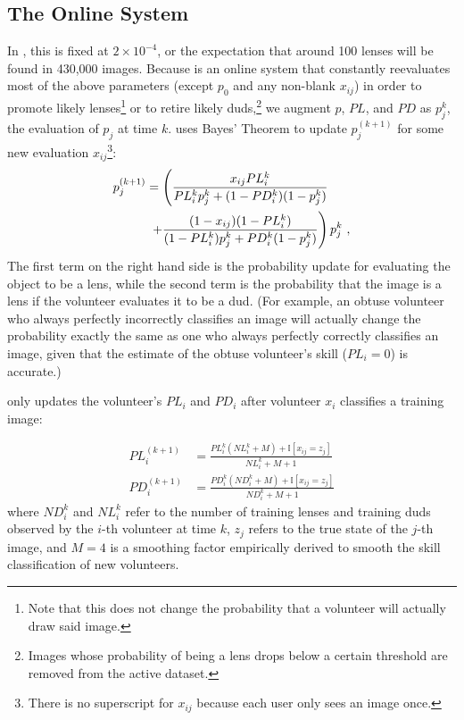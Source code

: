 \documentclass[useAMS,usenatbib,a4paper]{mn2e}
\begin{document}
\subsection{The Online System}
\label{sec:formalism:online}
In \sw, this is fixed at $2 \times 10^{-4}$, or the expectation that
around 100 lenses will be found in 430,000 images. Because \sw is an online
system that constantly reevaluates most of the above parameters (except $p_0$
and any non-blank $x_{ij}$) in order to promote likely lenses\footnote{Note
that this does not change the probability that a volunteer will actually draw
said image.} or to retire likely duds,\footnote{Images whose probability of
being a lens drops below a certain threshold are removed from the active
dataset.} we augment $p$, $PL$, and $PD$ as $p_j^k$, the evaluation of
$p_j$ at time $k$. \sw uses Bayes' Theorem to update $p_j^{(k + 1)}$ for
some new evaluation $x_{ij}$\footnote{There is no superscript for $x_{ij}$
because each user only sees an image once.}:
\begin{align}
  p_j^{(k + 1)} &= \left ( \frac{x_{ij} PL_{i}^{k}
  }{PL_{i}^{k} p_j^k + (1 - PD_{i}^{k})(1 -
  p_j^k)}
  \right. \notag \\ & \; \left . +
  \frac{(1 - x_{ij}) (1 - PL_{i}^{k})
  }{(1 - PL_{i}^{k}) p_j^k + PD_{i}^{k}(1 -
  p_j^k)} \right ) p_j^k \ ,
\end{align}
The first term on the right hand side is the probability update for evaluating
the object to be a lens, while the second term is the probability that the
image is a lens if the volunteer evaluates it to be a dud.  (For example, an
obtuse volunteer who always perfectly incorrectly classifies an image will
actually change the probability exactly the same as one who always perfectly
correctly classifies an image, given that the estimate of the obtuse
volunteer's skill ($PL_{i} = 0$) is accurate.)

\sw only updates the volunteer's $PL_{i}$ and $PD_{i}$ after volunteer $x_i$
classifies a training image:

\begin{align}
  PL_{i}^{(k + 1)} &= \frac{PL_{i}^{k} (NL_{i}^{k} + M) + \mathbb{I}[x_{ij} =
  z_{j}]}{NL_{i}^{k} + M + 1} \\
  PD_{i}^{(k + 1)} &= \frac{PD_{i}^{k} (ND_{i}^{k} + M) + \mathbb{I}[x_{ij} =
  z_{j}]}{ND_{i}^{k} + M + 1}
\end{align}
where $ND_{i}^{k}$ and $NL_{i}^{k}$ refer to the number of training lenses and
training duds observed by the $i$-th volunteer at time $k$, $z_{j}$ refers
to the true state of the $j$-th image, and $M = 4$ is a smoothing factor
empirically derived to smooth the skill classification of new volunteers.
\end{document}
